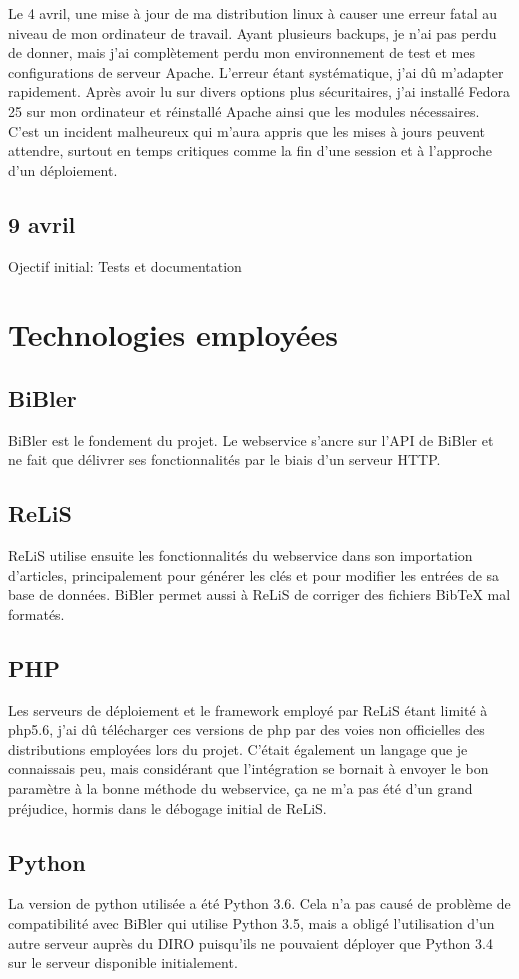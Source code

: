 \documentclass[a4paper,12pt,titlepage]{article}
\begin{document}
Le 4 avril, une mise à jour de ma distribution linux à causer une erreur fatal au niveau de mon ordinateur de travail. Ayant plusieurs backups, je n'ai pas perdu de donner, mais j'ai complètement perdu mon environnement de test et mes configurations de serveur Apache. L'erreur étant systématique, j'ai dû m'adapter rapidement. Après avoir lu sur divers options plus sécuritaires, j'ai installé Fedora 25 sur mon ordinateur et réinstallé Apache ainsi que les modules nécessaires. C'est un incident malheureux qui m'aura appris que les mises à jours peuvent attendre, surtout en temps critiques comme la fin d'une session et à l'approche d'un déploiement.

\subsection{9 avril}
Ojectif initial: Tests et documentation \newline


\section{Technologies employées}
\subsection{BiBler}
BiBler est le fondement du projet. Le webservice s'ancre sur l'API de BiBler et ne fait que délivrer ses fonctionnalités par le biais d'un serveur HTTP. 
\subsection{ReLiS}
ReLiS utilise ensuite les fonctionnalités du webservice dans son importation d'articles, principalement pour générer les clés et pour modifier les entrées de sa base de données. BiBler permet aussi à ReLiS de corriger des fichiers BibTeX mal formatés.
\subsection{PHP}
Les serveurs de déploiement et le framework employé par ReLiS étant limité à php5.6, j'ai dû télécharger ces versions de php par des voies non officielles des distributions employées lors du projet. C'était également un langage que je connaissais peu, mais considérant que l'intégration se bornait à envoyer le bon paramètre à la bonne méthode du webservice, ça ne m'a pas été d'un grand préjudice, hormis dans le débogage initial de ReLiS.
\subsection{Python}
La version de python utilisée a été Python 3.6. Cela n'a pas causé de problème de compatibilité avec BiBler qui utilise Python 3.5, mais a obligé l'utilisation d'un autre serveur auprès du DIRO puisqu'ils ne pouvaient déployer que Python 3.4 sur le serveur disponible initialement. \newline
\end{document}

